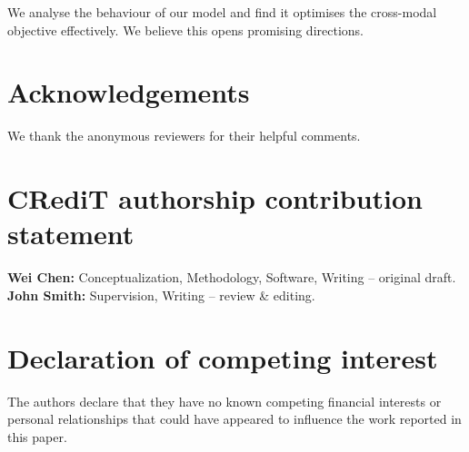 \documentclass[a4paper,fleqn]{cas-dc}
\begin{document}
We analyse the behaviour of our model and find it optimises the cross-modal
objective effectively. We believe this opens promising directions.

\section*{Acknowledgements}

We thank the anonymous reviewers for their helpful comments.

\section*{CRediT authorship contribution statement}

\textbf{Wei Chen:} Conceptualization, Methodology, Software, Writing -- original draft.
\textbf{John Smith:} Supervision, Writing -- review \& editing.

\section*{Declaration of competing interest}

The authors declare that they have no known competing financial interests
or personal relationships that could have appeared to influence the work
reported in this paper.



\end{document}
